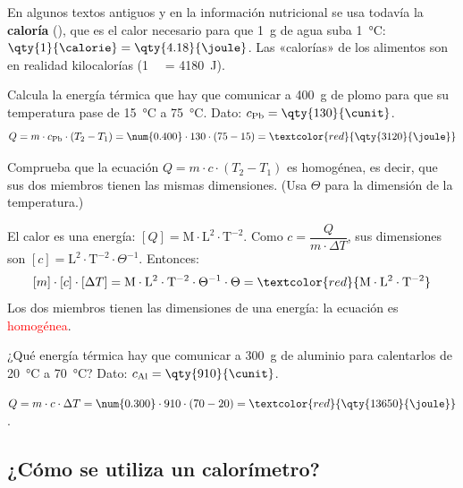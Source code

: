 En algunos textos antiguos y en la información nutricional se usa todavía la \textbf{caloría} (\unit{\calorie}), que es el calor necesario para que \qty{1}{\gram} de agua suba \qty{1}{\degreeCelsius}: \(\qty{1}{\calorie} = \qty{4.18}{\joule}\). Las «calorías» de los alimentos son en realidad kilocalorías (\qty{1}{\kilo\calorie} = \qty{4180}{\joule}).

\begin{example}
    Calcula la energía térmica que hay que comunicar a \qty{400}{\gram} de plomo para que su temperatura pase de \qty{15}{\degreeCelsius} a \qty{75}{\degreeCelsius}. Dato: \(c_{\text{Pb}} = \qty{130}{\cunit}\).
    \[ Q = m \cdot c_{\text{Pb}} \cdot (T_2 - T_1) = \num{0.400} \cdot 130 \cdot (75 - 15) = \textcolor{red}{\qty{3120}{\joule}} \]
\end{example}

\begin{exercise}
    Comprueba que la ecuación \(Q = m \cdot c \cdot (T_2 - T_1)\) es homogénea, es decir, que sus dos miembros tienen las mismas dimensiones. (Usa \(\Theta\) para la dimensión de la temperatura.)
    \begin{solu}
        El calor es una energía: \([Q] = \mathrm{M \cdot L^2 \cdot T^{-2}}\). Como \(c = \dfrac{Q}{m \cdot \Delta T}\), sus dimensiones son \([c] = \mathrm{L^2 \cdot T^{-2}} \cdot \Theta^{-1}\). Entonces:
        \[ [m] \cdot [c] \cdot [\Delta T] = \mathrm{M} \cdot \mathrm{L^2 \cdot T^{-2}} \cdot \Theta^{-1} \cdot \Theta = \textcolor{red}{\mathrm{M \cdot L^2 \cdot T^{-2}}} \]
        Los dos miembros tienen las dimensiones de una energía: la ecuación es \textcolor{red}{homogénea}.
    \end{solu}
\end{exercise}

\begin{exercise}
    ¿Qué energía térmica hay que comunicar a \qty{300}{\gram} de aluminio para calentarlos de \qty{20}{\degreeCelsius} a \qty{70}{\degreeCelsius}? Dato: \(c_{\text{Al}} = \qty{910}{\cunit}\).
    \begin{solu}
        \(Q = m \cdot c \cdot \Delta T = \num{0.300} \cdot 910 \cdot (70 - 20) = \textcolor{red}{\qty{13650}{\joule}}\).
    \end{solu}
\end{exercise}

\subsection{¿Cómo se utiliza un calorímetro?}

